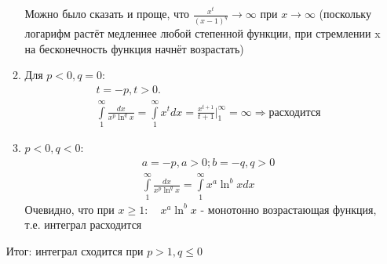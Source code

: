 \documentclass[a4paper, 12pt]{article}
\begin{document}
\begin{enumerate}
\begin{enumerate}
     Можно было сказать и проще, что $\frac{x^t}{(x-1)^q}\to\infty$ при $x\to\infty$ (поскольку логарифм растёт медленнее любой степенной функции, при стремлении x на бесконечность функция начнёт возрастать)
     \item
     Для $p < 0, q = 0$:
     \begin{align*}
      &t = -p, t>0. \\
      &\int\limits_1^\infty\frac{dx}{x^p\ln^qx} = 
      \int\limits_1^\infty x^tdx = \frac{x^{t+1}}{t+1}\Big|_1^\infty = \infty \Rightarrow \text{расходится}
     \end{align*}
     \item $p<0, q<0$:
     \begin{align*}
      &a = -p, a>0; b = -q, q>0  \\
      &\int\limits_1^\infty\frac{dx}{x^p\ln^qx} = 
      \int\limits_1^\infty x^a\ln^bxdx
     \end{align*}
     Очевидно, что при $x\geq1:\quad x^a\ln^bx$ - монотонно возрастающая функция, т.е. интеграл расходится 
    \end{enumerate}
Итог: интеграл сходится при $p>1,q\leq0$
\end{enumerate}
\end{document}
